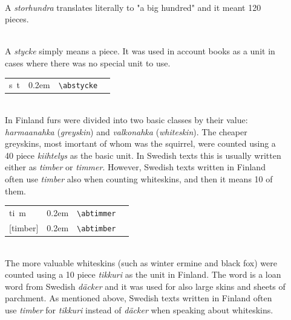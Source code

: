 \documentclass[a4paper]{article}
\newcommand{\samplefont}{\fontsize{16}{16}\abcursivefamily\spaceskip0.2em}
\newcommand{\sample}[1]{{\samplefont #1 \strut}}
\newcommand{\ltxncmd}[1]{\texttt{\textbackslash{}#1}}
\begin{document}
\begin{description}
\item [\sample{storhundra} \emph{storhundra} ] \mbox{} \\
  A \emph{storhundra} translates literally to "a big hundred" and it
  meant 120 pieces.

\item [\sample{stycke}, \sample{\abstycke} \emph{stycke},
  \emph{kappale}] \mbox{} \\
  A \emph{stycke} simply means a piece. It was used in account books
  as a unit in cases where there was no special unit to use.
  \begin{center}
    \begin{tabular}{llll}
      {}s~t & \sample{\abstycke} & \ltxncmd{abstycke} \\
    \end{tabular}
  \end{center}

\item [\sample{\abtimmer}, \sample{\abtimber} \emph{timmer}, \emph{timber}, \emph{kiihtelys}] \mbox{} \\
  In Finland furs were divided into two basic classes by their value:
  \emph{harmaanahka} (\emph{greyskin}) and \emph{valkonahka}
  (\emph{whiteskin}). The cheaper greyskins, most imortant of whom was
  the squirrel, were counted using a 40 piece \emph{kiihtelys} as the
  basic unit. In Swedish texts this is usually written either as
  \emph{timber} or \emph{timmer}. However, Swedish texts written in
  Finland often use \emph{timber} also when counting whiteskins, and
  then it means 10 of them.
  \begin{center}
    \begin{tabular}{llll}
      {}ti~m & \sample{\abtimmer} & \ltxncmd{abtimmer} \\
      {}[timber] & \sample{\abtimber} & \ltxncmd{abtimber} \\
    \end{tabular}
  \end{center}


\item [\sample{\abdacker} \emph{däcker}, \emph{tikkuri}] \mbox{} \\
  The more valuable whiteskins (such as winter ermine and black fox)
  were counted using a 10 piece \emph{tikkuri} as the unit in Finland.
  The word is a loan word from Swedish \emph{däcker} and it was used
  for also large skins and sheets of parchment. As mentioned above,
  Swedish texts written in Finland often use \emph{timber} for
  \emph{tikkuri} instead of \emph{däcker} when speaking about
  whiteskins.


\end{description}
\end{document}
